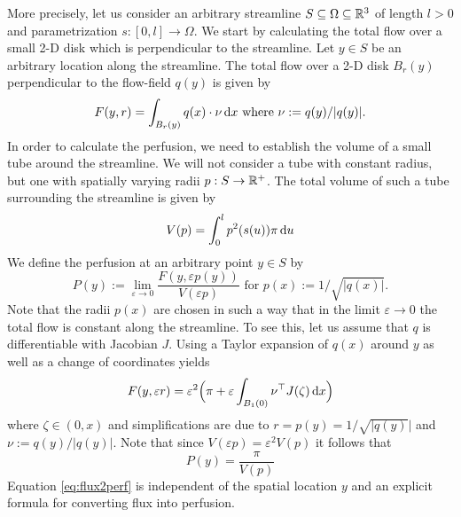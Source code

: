 \documentclass[journal,twocolumn]{IEEEtran}
\begin{document}
	More precisely, let us consider an arbitrary streamline $S \subseteq \Omega \subseteq \mathbb{R}^3$ of length $l>0$ and parametrization $s:[0,l] \to \Omega$.
	We start by calculating the total flow over a small 2-D disk which is perpendicular to the streamline.
	Let $y \in S$ be an arbitrary location along the streamline. 
	The total flow over a 2-D disk $B_r(y)$ perpendicular to the flow-field $q(y)$ is given by
	\[
		F(y,r) = \int_{B_r(y)} q(x) \cdot \nu \,\mathrm{d} x \text{ where }\nu := q(y)/\vert q(y) \vert.
	\]
	In order to calculate the perfusion, we need to establish the volume of a small tube around the streamline.
	We will not consider a tube with constant radius, but one with spatially varying radii $p:S \to \mathbb{R}^+$.
	The total volume of such a tube surrounding the streamline is given by
	\[
		V(p) = \int_0^l p^2(s(u))\pi \,\mathrm{d} u
	\]
	We define the perfusion at an arbitrary point $y \in S$ by
	\[
		P(y):=\lim_{\varepsilon \to 0} \frac{F(y,\varepsilon p(y))}{V(\varepsilon p)} \text{ for } p(x):=1/\sqrt{\vert q(x) \vert}.
	\]
	Note that the radii $p(x)$ are chosen in such a way that in the limit $\varepsilon \to 0$ the total flow is constant along the streamline. 
	To see this, let us assume that $q$ is differentiable with Jacobian $J$.
	Using a Taylor expansion of $q(x)$ around $y$ as well as a change of coordinates yields 
	\[
		F(y,\varepsilon r)
		= \varepsilon^2 \Big(\pi + \varepsilon \int_{B_{1}(0)} \nu^\top J(\zeta) \,\mathrm{d} x\Big)
	\]
	where $\zeta \in (0,x)$ and simplifications are due to $r = p(y) = 1/\sqrt{\vert q(y)} \vert$ and $\nu:=q(y)/\vert q(y) \vert$.
	Note that since $V(\varepsilon p) = \varepsilon^2 V(p)$ it follows that
	\begin{equation}\label{eq:flux2perf}
		P(y)= \frac{\pi}{V(p)}
	\end{equation}
	Equation \eqref{eq:flux2perf} is independent of the spatial location $y$ and an explicit formula for converting flux into perfusion.
	

\end{document}
